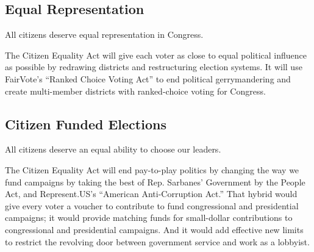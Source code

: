 \subsection{Equal Representation}

All citizens deserve equal representation in Congress.

The Citizen Equality Act will give each voter as close to equal political influence as possible by redrawing districts and restructuring election systems. It will use FairVote's ``Ranked Choice Voting Act'' to end political gerrymandering and create multi-member districts with ranked-choice voting for Congress.

\subsection{Citizen Funded Elections}

All citizens deserve an equal ability to choose our leaders.

The Citizen Equality Act will end pay-to-play politics by changing the way we fund campaigns by taking the best of  Rep. Sarbanes' Government by the People Act, and Represent.US's ``American Anti-Corruption Act.'' That hybrid would give every  voter a voucher to contribute to fund congressional and presidential campaigns; it would provide matching funds for small-dollar contributions to congressional and presidential campaigns. And it would add effective new limits to restrict the revolving door between government service and work as a lobbyist.
